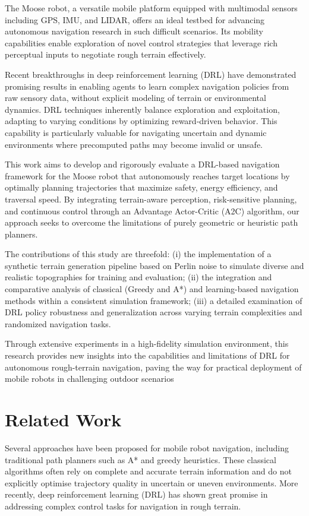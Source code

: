 \documentclass[conference]{IEEEtran}
\begin{document}
The Moose robot, a versatile mobile platform equipped with multimodal sensors including GPS, IMU, and LIDAR, offers an ideal testbed for advancing autonomous navigation research in such difficult scenarios. Its mobility capabilities enable exploration of novel control strategies that leverage rich perceptual inputs to negotiate rough terrain effectively.

Recent breakthroughs in deep reinforcement learning (DRL) have demonstrated promising results in enabling agents to learn complex navigation policies from raw sensory data, without explicit modeling of terrain or environmental dynamics. DRL techniques inherently balance exploration and exploitation, adapting to varying conditions by optimizing reward-driven behavior. This capability is particularly valuable for navigating uncertain and dynamic environments where precomputed paths may become invalid or unsafe.

This work aims to develop and rigorously evaluate a DRL-based navigation framework for the Moose robot that autonomously reaches target locations by optimally planning trajectories that maximize safety, energy efficiency, and traversal speed. By integrating terrain-aware perception, risk-sensitive planning, and continuous control through an Advantage Actor-Critic (A2C) algorithm, our approach seeks to overcome the limitations of purely geometric or heuristic path planners.

The contributions of this study are threefold:
(i) the implementation of a synthetic terrain generation pipeline based on Perlin noise to simulate diverse and realistic topographies for training and evaluation;
(ii) the integration and comparative analysis of classical (Greedy and A*) and learning-based navigation methods within a consistent simulation framework;
(iii) a detailed examination of DRL policy robustness and generalization across varying terrain complexities and randomized navigation tasks.

Through extensive experiments in a high-fidelity simulation environment, this research provides new insights into the capabilities and limitations of DRL for autonomous rough-terrain navigation, paving the way for practical deployment of mobile robots in challenging outdoor scenarios

\section{Related Work}

Several approaches have been proposed for mobile robot navigation, including traditional path planners such as A* and greedy heuristics. These classical algorithms often rely on complete and accurate terrain information and do not explicitly optimise trajectory quality in uncertain or uneven environments. More recently, deep reinforcement learning (DRL) has shown great promise in addressing complex control tasks for navigation in rough terrain.
\end{document}
